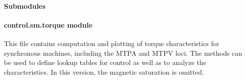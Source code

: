\documentclass[letterpaper,10pt,english]{sphinxmanual}
\begin{document}
\paragraph{Submodules}
\label{\detokenize{control.sm:submodules}}

\paragraph{control.sm.torque module}
\label{\detokenize{control.sm:module-control.sm.torque}}\label{\detokenize{control.sm:control-sm-torque-module}}
\sphinxAtStartPar
This file contains computation and plotting of torque characteristics for
synchronous machines, including the MTPA and MTPV loci. The methods can be used
to define look\sphinxhyphen{}up tables for control as well as to analyze the characteristics.
In this version, the magnetic saturation is omitted.
\end{document}

